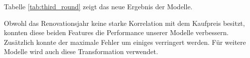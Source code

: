 Tabelle \ref{tab:third_round} zeigt das neue Ergebnis der Modelle.\\[2ex]
%
\begin{table}[ht]
\centering
{}
\caption{Ergebnisse mit Einbezug der Renovation}
\label{tab:third_round}
\end{table}
%
Obwohl das Renovationsjahr keine starke Korrelation mit dem Kaufpreis besitzt, konnten diese beiden Features die Performance unserer Modelle verbessern. Zusätzlich konnte der maximale Fehler um einiges verringert werden. Für weitere Modelle wird auch diese Transformation verwendet.


